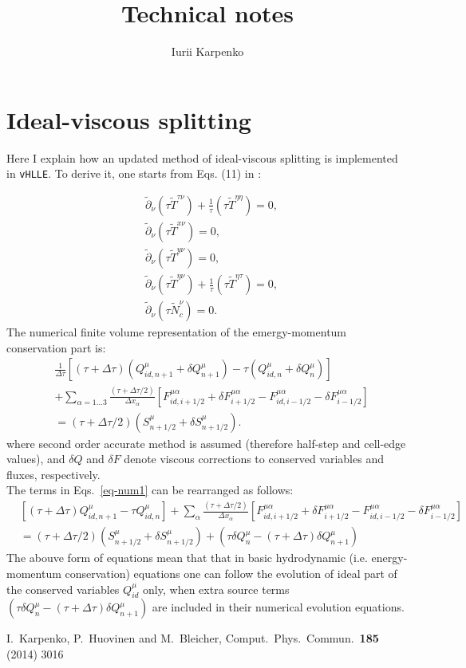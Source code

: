 \documentclass{article}
\title{Technical notes}
\author{Iurii Karpenko}
\newcommand{\dd}{\partial}
\begin{document}
\maketitle

\section{Ideal-viscous splitting}

Here I explain how an updated method of ideal-viscous splitting is implemented in \texttt{vHLLE}. To derive it, one starts from Eqs. (11) in \cite{Karpenko:2013wva}:

 \begin{align}\label{eqns1}
 &\tilde\dd_\nu(\tau \tilde T^{\tau\nu})+\frac{1}{\tau}(\tau \tilde T^{\eta\eta})=0, \nonumber\\
 &\tilde\dd_\nu (\tau \tilde T^{x\nu}) = 0, \nonumber\\
 &\tilde\dd_\nu (\tau \tilde T^{y\nu}) = 0,\\
 &\tilde\dd_\nu(\tau \tilde T^{\eta\nu}) + \frac{1}{\tau} (\tau \tilde T^{\eta\tau}) = 0, \nonumber\\
 &\tilde\dd_\nu(\tau \tilde N_c^\nu)=0. \nonumber
 \end{align}
The numerical finite volume representation of the emergy-momentum conservation part is:
\begin{align}\label{eq-num1}
&\frac{1}{\Delta\tau}\left[ (\tau+\Delta\tau)(Q^\mu_{id,n+1}+\delta Q^\mu_{n+1}) - \tau (Q^\mu_{id,n}+\delta Q^\mu_n) \right] \nonumber\\
&+\sum_{\alpha=1...3}\frac{(\tau+\Delta\tau/2)}{\Delta x_\alpha}\left[ F^{\mu\alpha}_{id,i+1/2}+\delta F^{\mu\alpha}_{i+1/2} - F^{\mu\alpha}_{id,i-1/2}-\delta F^{\mu\alpha}_{i-1/2} \right] \nonumber\\
&=(\tau+\Delta\tau/2)(S^\mu_{n+1/2}+\delta S^\mu_{n+1/2}).
\end{align}
where second order accurate method is assumed (therefore half-step and cell-edge values), and $\delta Q$ and $\delta F$ denote viscous corrections to conserved variables and fluxes, respectively.\\
The terms in Eqs.~\ref{eq-num1} can be rearranged as follows:
\begin{align}
&\left[ (\tau+\Delta\tau)Q^\mu_{id,n+1} - \tau Q^\mu_{id,n} \right]
+\sum_{\alpha}\frac{(\tau+\Delta\tau/2)}{\Delta x_\alpha}\left[ F^{\mu\alpha}_{id,i+1/2}+\delta F^{\mu\alpha}_{i+1/2} - F^{\mu\alpha}_{id,i-1/2}-\delta F^{\mu\alpha}_{i-1/2} \right] \nonumber\\
&=(\tau+\Delta\tau/2)(S^\mu_{n+1/2}+\delta S^\mu_{n+1/2}) + (\tau\delta Q^\mu_n - (\tau+\Delta\tau)\delta Q^\mu_{n+1})
\end{align}
The abouve form of equations mean that that in basic hydrodynamic (i.e. energy-momentum conservation) equations one can follow the evolution of ideal part of the conserved variables $Q_{id}^\mu$ only, when extra source terms $(\tau\delta Q^\mu_n - (\tau+\Delta\tau)\delta Q^\mu_{n+1})$ are included in their numerical evolution equations.

\begin{thebibliography}{0}
  I.~Karpenko, P.~Huovinen and M.~Bleicher,
  Comput.\ Phys.\ Commun.\  {\bf 185} (2014) 3016
\end{thebibliography}
\end{document}
